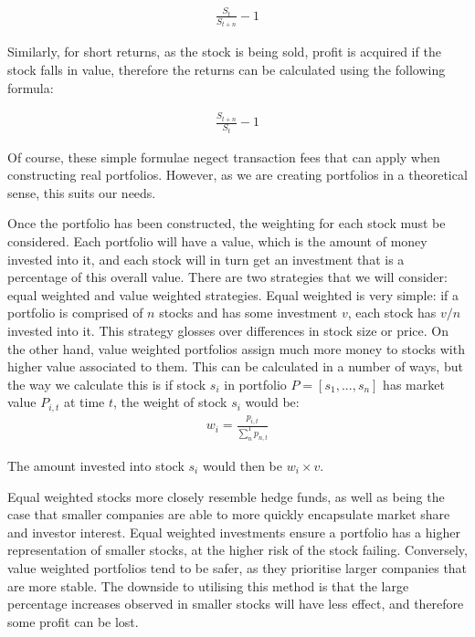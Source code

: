 \documentclass[ oneside,%
                    author={Joshua Felmeden},
                    degree={MEng},
                     title={Semantic Analysis of Financial Headlines Based on Realised Stock Returns},
                  subtitle={}]{dissertation}
\begin{document}
\begin{align*}
\frac{S_{t}}{S_{t+n}} - 1
\end{align*}

Similarly, for short returns, as the stock is being sold, profit is acquired if the stock falls in value, therefore the returns can be calculated using the following formula:

\begin{align*}
\frac{S_{t+n}}{S_{t}} - 1
\end{align*}

Of course, these simple formulae negect transaction fees that can apply when constructing real portfolios. However, as we are creating portfolios in a theoretical sense, this suits our needs.

Once the portfolio has been constructed, the weighting for each stock must be considered. Each portfolio will have a value, which is the amount of money invested into it, and each stock will in turn get an investment that is a percentage of this overall value. There are two strategies that we will consider: equal weighted and value weighted strategies. Equal weighted is very simple: if a portfolio is comprised of $n$ stocks and has some investment $v$, each stock has $v/n$ invested into it. This strategy glosses over differences in stock size or price. On the other hand, value weighted portfolios assign much more money to stocks with higher value associated to them. This can be calculated in a number of ways, but the way we calculate this is if stock $s_i$ in portfolio $P = [s_1, ..., s_n]$ has market value $P_{i,t}$ at time $t$, the weight of stock $s_i$ would be:
\begin{align*}
w_i = \frac{p_{i,t}}{\sum_{n}^1 p_{n,t}}
\end{align*}

\noindent
The amount invested into stock $s_i$ would then be $w_i \times v$.

Equal weighted stocks more closely resemble hedge funds, as well as being the case that smaller companies are able to more quickly encapsulate market share and investor interest. Equal weighted investments ensure a portfolio has a higher representation of smaller stocks, at the higher risk of the stock failing. Conversely, value weighted portfolios tend to be safer, as they prioritise larger companies that are more stable. The downside to utilising this method is that the large percentage increases observed in smaller stocks will have less effect, and therefore some profit can be lost.
\end{document}
